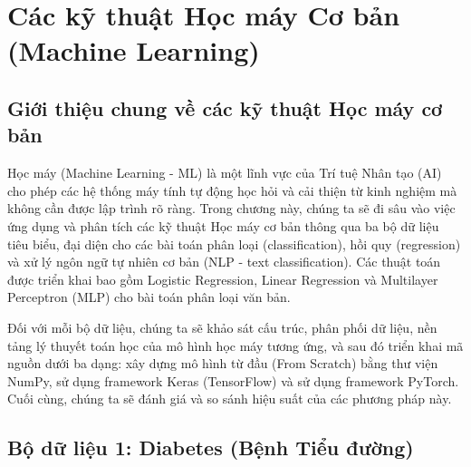 \documentclass[12pt,a4paper]{article}
\begin{document}

\newpage
\section{Các kỹ thuật Học máy Cơ bản (Machine Learning)}

\subsection{Giới thiệu chung về các kỹ thuật Học máy cơ bản}
Học máy (Machine Learning - ML) là một lĩnh vực của Trí tuệ Nhân tạo (AI) cho phép các hệ thống máy tính tự động học hỏi và cải thiện từ kinh nghiệm mà không cần được lập trình rõ ràng. Trong chương này, chúng ta sẽ đi sâu vào việc ứng dụng và phân tích các kỹ thuật Học máy cơ bản thông qua ba bộ dữ liệu tiêu biểu, đại diện cho các bài toán phân loại (classification), hồi quy (regression) và xử lý ngôn ngữ tự nhiên cơ bản (NLP - text classification). Các thuật toán được triển khai bao gồm Logistic Regression, Linear Regression và Multilayer Perceptron (MLP) cho bài toán phân loại văn bản.

Đối với mỗi bộ dữ liệu, chúng ta sẽ khảo sát cấu trúc, phân phối dữ liệu, nền tảng lý thuyết toán học của mô hình học máy tương ứng, và sau đó triển khai mã nguồn dưới ba dạng: xây dựng mô hình từ đầu (From Scratch) bằng thư viện NumPy, sử dụng framework Keras (TensorFlow) và sử dụng framework PyTorch. Cuối cùng, chúng ta sẽ đánh giá và so sánh hiệu suất của các phương pháp này.

\newpage
\subsection{Bộ dữ liệu 1: Diabetes (Bệnh Tiểu đường)}
\end{document}
